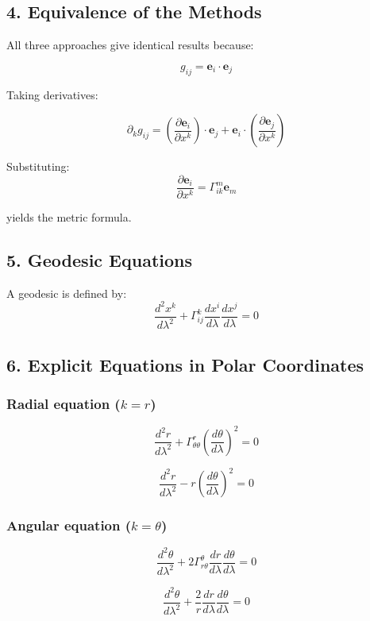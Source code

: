 \documentclass{article}
\begin{document}
	\subsection*{4. Equivalence of the Methods}
	
	All three approaches give identical results because:
	
	\[
	g_{ij} = \mathbf{e}_i \cdot \mathbf{e}_j
	\]
	
	Taking derivatives:
	
	\[
	\partial_k g_{ij}
	=
	\left(\frac{\partial \mathbf{e}_i}{\partial x^k}\right)\cdot \mathbf{e}_j
	+
	\mathbf{e}_i \cdot \left(\frac{\partial \mathbf{e}_j}{\partial x^k}\right)
	\]
	
	Substituting:
	\[
	\frac{\partial \mathbf{e}_i}{\partial x^k} = \Gamma^m_{ik}\mathbf{e}_m
	\]
	
	yields the metric formula.
	
	\subsection*{5. Geodesic Equations}
	
	A geodesic is defined by:
	\[
	\frac{d^2 x^k}{d\lambda^2}
	+
	\Gamma^k_{ij}
	\frac{dx^i}{d\lambda}
	\frac{dx^j}{d\lambda}
	=0
	\]
	
	\subsection*{6. Explicit Equations in Polar Coordinates}
	
	\subsubsection*{Radial equation ($k=r$)}
	
	\[
	\frac{d^2 r}{d\lambda^2}
	+
	\Gamma^r_{\theta\theta}
	\left(\frac{d\theta}{d\lambda}\right)^2
	=0
	\]
	
	\[
	\frac{d^2 r}{d\lambda^2}
	- r \left(\frac{d\theta}{d\lambda}\right)^2
	=0
	\]
	
	\subsubsection*{Angular equation ($k=\theta$)}
	
	\[
	\frac{d^2 \theta}{d\lambda^2}
	+
	2 \Gamma^\theta_{r\theta}
	\frac{dr}{d\lambda}
	\frac{d\theta}{d\lambda}
	=0
	\]
	
	\[
	\frac{d^2 \theta}{d\lambda^2}
	+
	\frac{2}{r}
	\frac{dr}{d\lambda}
	\frac{d\theta}{d\lambda}
	=0
	\]
	
\end{document}
